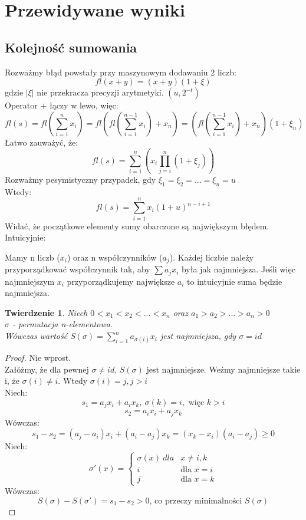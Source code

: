 \documentclass{article}
\newtheorem{theorem}{Twierdzenie}
\begin{document}
	\section{Przewidywane wyniki}
	 
	 \subsection{Kolejność sumowania}
	 Rozważmy błąd powstały przy maszynowym dodawaniu 2 liczb: \\
	 	$$ fl(x+y) = (x+y)(1 + \xi)$$ gdzie $|\xi|$ nie przekracza precyzji arytmetyki. $ (u, 2^{-t} ) $ \\
	 Operator $+$ łączy w lewo, więc:
	 	$$ fl(s) = fl(\sum\limits_{i=1}^n x_{i}) = fl( fl(\sum\limits_{i=1}^{n-1} x_{i}) + x_{n}) =
	 		( fl(\sum\limits_{i=1}^{n-1} x_{i}) + x_{n} )(1 + \xi_{n}) $$
	 Łatwo zauważyć, że:
	 	$$ fl(s) = \sum\limits_{i=1}^n ( x_{i} \prod_{j=i}^n (1+ \xi_{j}) ) $$
	 Rozważmy pesymistyczny przypadek, gdy $\xi_{1} = \xi_{2} = ... = \xi_{n} = u $ \\
	 Wtedy:
	 	$$ fl(s) = \sum\limits_{i=1}^n x_{i}(1 + u)^{n-i+1} $$
	 Widać, że początkowe elementy sumy obarczone są największym błędem. \\
	 Intuicyjnie:
	 \par Mamy n liczb ($x_{i}$) oraz n współczynników ($a_{j}$). Każdej liczbie należy przyporządkować współczynnik tak, aby $ \sum a_{j}x_{i}$ była jak najmniejsza. Jeśli więc najmniejszym $x_{i}$ przyporządkujemy największe $a_{i}$ to intuicyjnie suma będzie najmniejsza.
	 \begin{theorem}
	 	Niech $0 < x_{1} < x_{2} < ... < x_{n} $ oraz $ a_{1} >  a_{2} > ... > a_{n} > 0 $ \\
	 	$ \sigma $ - permutacja n-elementowa. \\
	 	Wówczas wartość $S(\sigma) = \sum\limits_{i=1}^n a_{\sigma(i)}x_{i}$  jest najmniejsza, gdy $\sigma = id$
	 \end{theorem}
	 
	 \begin{proof}
	 	Nie wprost. \\
	 	Załóżmy, że dla pewnej $\sigma \neq id$, $S(\sigma)$ jest najmniejsze. 
	 	Weźmy najmniejsze takie i, że $\sigma(i) \neq i$. Wtedy $\sigma(i) = j, j > i$ \\
	 	Niech:
	 	$$ s_{1} = a_{j}x_{i} + a_{i}x_{k} , \ \sigma(k) = i, \text{ więc } k > i $$
	    $$ s_{2} = a_{i}x_{i} + a_{j}x_{k}$$
	 	Wówczas: $$ s_{1} - s_{2} = (a_{j} - a_{i})x_{i} + (a_{i}- a_{j})x_{k} = 
	 				(x_{k} - x_{i})(a_{i} - a_{j}) \ge 0 $$
	 	Niech:
	 		$$ \sigma'(x) =\left\{ \begin{array}{ll}
    \sigma(x) \ dla  & \textrm{$x \neq i, k$}\\
    i & \textrm{dla $x = i$}\\
    j &  \textrm{dla $x = k$}
    \end{array} \right.
    $$
    Wówczas:
    		$$ S(\sigma) - S(\sigma') = s_{1} - s_{2} > 0 \text{, co przeczy minimalności } S(\sigma) $$
	 \end{proof}
	 
\end{document}
